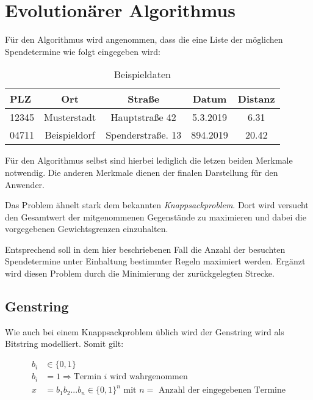 \section{Evolutionärer Algorithmus}\label{sec:evol-alg}
Für den Algorithmus wird angenommen,
dass die eine Liste der möglichen Spendetermine wie folgt eingegeben wird:
\begin{table}[ht]
    \begin{center}
        \begin{tabular}{l|c|c|c|c}
            PLZ     & Ort               &  Straße               & Datum     & Distanz   \\
            \hline
            12345   & Musterstadt       & Hauptstraße 42        & 5.3.2019  & 6.31      \\
            04711   & Beispieldorf      & Spenderstraße. 13     & 894.2019  & 20.42     \\
        \end{tabular}
    \end{center}
    \caption{Beispieldaten}
\end{table}


Für den Algorithmus selbst sind hierbei lediglich die letzen beiden Merkmale notwendig.
Die anderen Merkmale dienen der finalen Darstellung für den Anwender.

Das Problem ähnelt stark dem bekannten \emph{Knappsackproblem}.
Dort wird versucht den Gesamtwert der mitgenommenen Gegenstände zu maximieren
und dabei die vorgegebenen Gewichtsgrenzen einzuhalten.

Entsprechend soll in dem hier beschriebenen Fall die Anzahl der besuchten Spendetermine unter
Einhaltung bestimmter Regeln maximiert werden.
Ergänzt wird diesen Problem durch die Minimierung der zurückgelegten Strecke.

\subsection{Genstring}
Wie auch bei einem Knappsackproblem üblich wird der Genstring wird als Bitstring modelliert.
Somit gilt:

\begin{equation}
    \label{eqn:genstring}
    \begin{split}
        b_i &\in \{ 0,1 \} \\
        b_i &= 1 \Rightarrow \text{Termin $i$ wird wahrgenommen} \\
        x   &= b_1b_2...b_n \in \{0,1\}^n\text{ mit $n = $ Anzahl der eingegebenen Termine}
    \end{split}
\end{equation}

